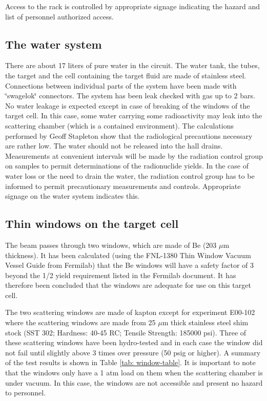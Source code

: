 {Access to the rack is controlled by appropriate signage indicating
the hazard and list of personnel authorized access.


\begin{safetyen}{10}{10}
\subsection{The water system}
\end{safetyen}

There are about 17 liters of pure water in the circuit. The water
tank, the tubes, the target and the cell containing the target fluid
are made of stainless steel. Connections between individual parts
of the system have been made with \char`\"{}swagelok\char`\"{} connectors.
The system has been leak checked with gas up to 2 bars. No water leakage
is expected except in case of breaking of the windows of the target
cell. In this case, some water carrying some radioactivity may leak
into the scattering chamber (which is a contained environment). The
calculations performed by Geoff Stapleton show that
the radiological precautions necessary are rather low. The water should
not be released into the hall drains. Measurements at convenient intervals
will be made by the radiation control group on samples to permit determinations
of the radionuclide yields. In the case of water loss or the need
to drain the water, the radiation control group has to be informed
to permit precautionary measurements and controls. Appropriate signage
on the water system indicates this.

\begin{safetyen}{10}{10}
\subsection{Thin windows on the target cell}
\end{safetyen}

The beam passes through two windows, which are made of Be (203 $\mu $m
thickness). It has been calculated (using the FNL-1380 Thin Window
Vacuum Vessel Guide from Fermilab) that the Be windows will have a
safety factor of 3 beyond the 1/2 yield requirement listed in the
Fermilab document. It has therefore been concluded that the windows
are adequate for use on this target cell.

The two scattering windows are made of kapton except for experiment
E00-102 where the scattering windows are made from 25 $\mu $m thick
stainless steel shim stock (SST 302; Hardness: 40-45 RC; Tensile Strength:
185000 psi). Three of these scattering windows have been hydro-tested
and in each case the window did not fail until slightly above 3 times
over pressure (50 psig or higher). A summary of the test results is
shown in Table \ref{tab: window-table}. It is important to note that
the windows only have a 1 atm load on them when the scattering chamber
is under vacuum. In this case, the windows are not accessible and
present no hazard to personnel.

}
